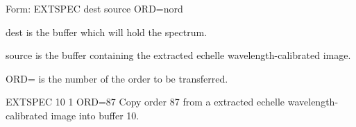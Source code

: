 {\newpage\clearpage
{}%
\begin{command}
  \item[Form: EXTSPEC dest source ORD=nord\hfill]{}
  \item[dest]{is the buffer which will hold the spectrum.}
  \item[source]{is the buffer containing the extracted
       echelle wavelength-calibrated image.}
  \item[ORD=]{is the number of the order to be transferred.}
\end{command}%
\lthtmlfigureZ
\lthtmlcheckvsize\clearpage}

{\newpage\clearpage
{}%
\begin{example}
  \item[EXTSPEC 10 1 ORD=87\hfill]{ Copy order 87 from a extracted echelle
       wavelength-calibrated image into buffer 10.}
\end{example}%
\lthtmlfigureZ
\lthtmlcheckvsize\clearpage}

